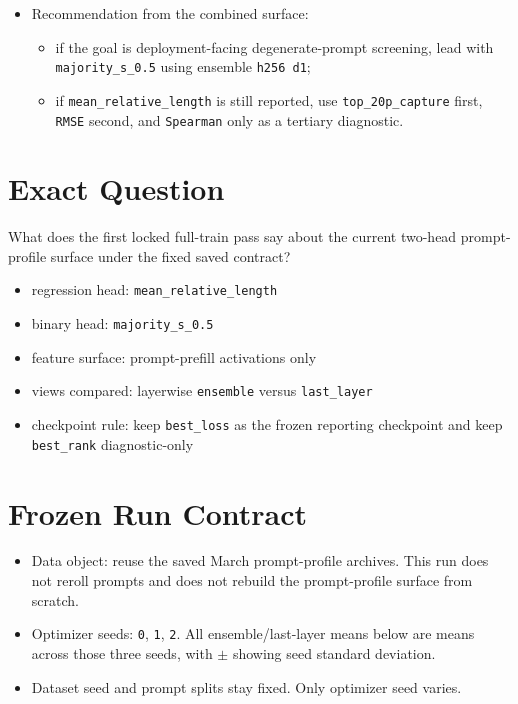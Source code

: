 \documentclass[11pt]{article}
\begin{document}
\begin{itemize}[leftmargin=1.5em]
\item Recommendation from the combined surface:
  \begin{itemize}[leftmargin=1.5em]
  \item if the goal is deployment-facing degenerate-prompt screening, lead with \texttt{majority\_s\_0.5} using ensemble \texttt{h256 d1};
  \item if \texttt{mean\_relative\_length} is still reported, use \texttt{top\_20p\_capture} first, \texttt{RMSE} second, and \texttt{Spearman} only as a tertiary diagnostic.
  \end{itemize}
\end{itemize}

\section*{Exact Question}
What does the first locked full-train pass say about the current two-head prompt-profile surface under the fixed saved contract?

\begin{itemize}[leftmargin=1.5em]
\item regression head: \texttt{mean\_relative\_length}
\item binary head: \texttt{majority\_s\_0.5}
\item feature surface: prompt-prefill activations only
\item views compared: layerwise \texttt{ensemble} versus \texttt{last\_layer}
\item checkpoint rule: keep \texttt{best\_loss} as the frozen reporting checkpoint and keep \texttt{best\_rank} diagnostic-only
\end{itemize}

\section*{Frozen Run Contract}
\begin{itemize}[leftmargin=1.5em]
\item Data object: reuse the saved March prompt-profile archives. This run does not reroll prompts and does not rebuild the prompt-profile surface from scratch.
\item Optimizer seeds: \texttt{0}, \texttt{1}, \texttt{2}. All ensemble/last-layer means below are means across those three seeds, with \texttt{$\pm$} showing seed standard deviation.
\item Dataset seed and prompt splits stay fixed. Only optimizer seed varies.
\end{itemize}
\end{document}
